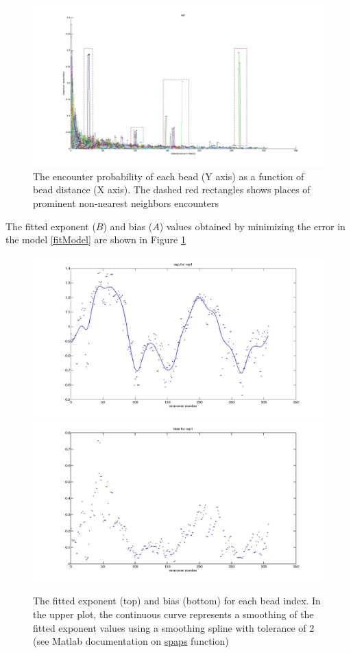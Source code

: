 \documentclass[12pt]{paper}
\begin{document}
\begin{figure}[H]
\includegraphics*[scale=0.2]{EncounterFrequenciesByDistanceRep1}
\caption{\scriptsize{The encounter probability of each bead (Y axis) as a function of bead distance (X axis). The dashed red rectangles shows places of prominent non-nearest neighbors encounters}}
\end{figure}

The fitted exponent ($B$) and bias ($A$) values obtained by minimizing the error in the model \ref{fitModel} are shown in Figure \ref{fittedExpAndBias}
\begin{figure}[H]\label{fittedExpAndBias}
\includegraphics[scale=0.15]{fittedExpValuesWithSplineRep1}
\includegraphics[scale=0.15]{fittedBiasValuesRep1}
\caption{\scriptsize{The fitted exponent (top) and bias (bottom) for each bead index. In the upper plot, the continuous curve represents a smoothing of the fitted exponent values using a smoothing spline with tolerance of 2 (see Matlab documentation on \href{http://www.mathworks.fr/fr/help/curvefit/spaps.html}{spaps} function)}}
\end{figure}
\end{document}
